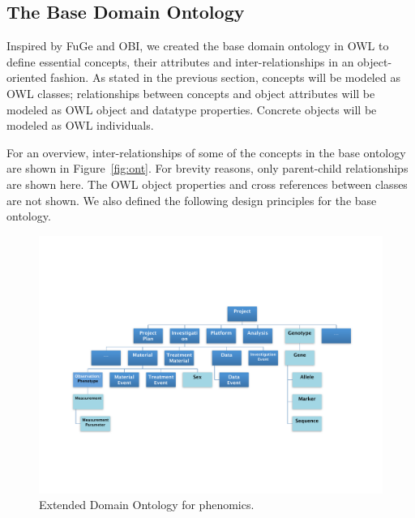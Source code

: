 \documentclass[conference,10pt]{IEEEtran}
\begin{document}
\subsection{The Base Domain Ontology}
Inspired by FuGe and OBI, we created the base domain ontology in OWL to define essential concepts, their attributes and inter-relationships in an object-oriented fashion. As stated in the previous section, concepts will be modeled as OWL classes; relationships between concepts and object attributes will be modeled as OWL object and datatype properties. Concrete objects will be modeled as OWL individuals.

For an overview, inter-relationships of some of the concepts in the base ontology are shown in Figure~\ref{fig:ont}. For brevity reasons, only parent-child relationships are shown here. The OWL object properties and cross references between classes are not shown. We also defined the following design principles for the base ontology.

\begin{figure}[!b]
\vspace{-16pt}
\centering
\includegraphics[trim = 0mm 30mm 0mm 48mm, clip,width=160mm]{podd_ont.pdf}
\vspace{-32pt}
\caption{Extended Domain Ontology for phenomics.}\label{fig:podd_ont}
\end{figure}
\end{document}
